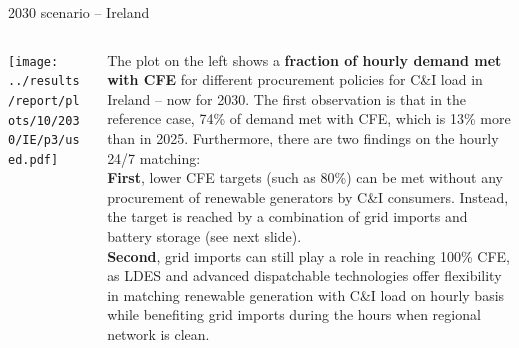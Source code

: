 \begin{frame}{2030 scenario -- Ireland}

{\footnotesize

\begin{columns}[T]
\begin{column}{9cm}
\centering

\texttt{[image: ../results/report/plots/10/2030/IE/p3/used.pdf]}
\end{column}
\begin{column}{6cm}

\vspace{0.1cm}
The plot on the left shows a {\bf fraction of hourly demand met with CFE} 
for different procurement policies for C\&I load in Ireland -- now for 2030.
The first observation is that in the reference case,
74\% of demand met with CFE, which is 13\% more than in 2025. 
Furthermore, there are \alert{two findings} 
on the hourly 24/7 matching: \\

\vspace{0.1cm}
{\bf First}, lower CFE targets (such as 80\%) can be met without 
any procurement of renewable generators by C\&I consumers. Instead,
the target is reached by a combination of grid imports and battery
storage (see next slide). \\

\vspace{0.1cm}
{\bf Second}, grid imports can still play a role in reaching 100\% CFE,
as LDES and advanced dispatchable technologies offer flexibility
in matching renewable generation with C\&I load on hourly basis while 
benefiting grid imports during the hours when regional network is clean. 

\end{column}
\end{columns}
}
\end{frame}



